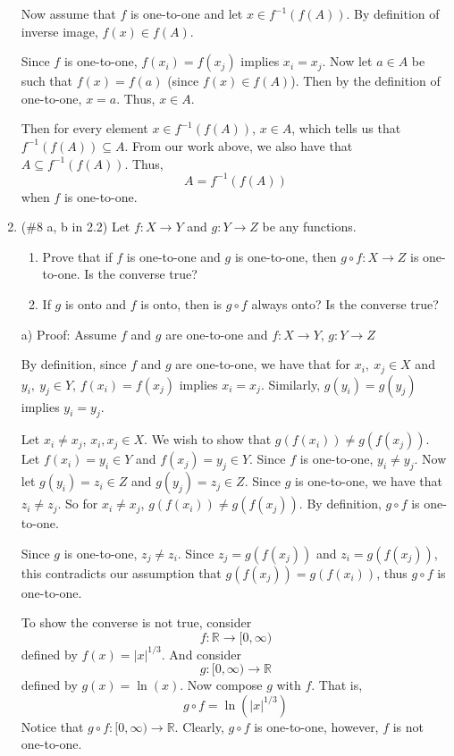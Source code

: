 \documentclass{article}
\begin{document}
\begin{enumerate}
Now assume that $f$ is one-to-one and let $x \in f^{-1}(f(A))$. By definition of inverse image, $f(x) \in f(A)$. 

Since $f$ is one-to-one, $f(x_i) = f(x_j)$ implies $x_i = x_j$. Now let $a \in A$ be such that $f(x) = f(a)$ (since $f(x) \in f(A)$). Then by the definition of one-to-one, $x = a$. Thus, $x \in A$.


Then for every element $x \in f^{-1}(f(A))$, $x \in A$, which tells us that $f^{-1}(f(A)) \subseteq A$. From our work above, we also have that $A \subseteq f^{-1}(f(A))$. Thus,
\[A = f^{-1}(f(A))\]
when $f$ is one-to-one.
\newline

\item{}
(\#8 a, b in 2.2) Let $f:X\to Y$ and $g:Y\to Z$ be any functions.
  \begin{enumerate}
  \item Prove that if $f$ is one-to-one and $g$ is one-to-one, then $g\circ f:X\to Z$ is one-to-one. Is the converse true?
  \item If $g$ is onto and $f$ is onto, then is $g\circ f$ always onto? Is the converse true?
  \end{enumerate}
  
  
a) Proof: Assume $f$ and $g$ are one-to-one and $f: X \to Y$, $g: Y \to Z$
\newline

By definition, since $f$ and $g$ are one-to-one, we have that for $x_i, \:x_j \in X$ and  $y_i, \: y_j \in Y$, $f(x_i) = f(x_j)$ implies $x_i = x_j$. Similarly, $g(y_i) = g(y_j)$ implies $y_i = y_j$.

Let $x_i \neq x_j$, $x_i, x_j \in X$. We wish to show that $g(f(x_i)) \neq g(f(x_j))$. Let $f(x_i) = y_i \in Y$ and $f(x_j) = y_j \in Y$. Since $f$ is one-to-one, $y_i \neq y_j$. Now let $g(y_i) = z_i \in Z$ and $g(y_j) = z_j \in Z$. Since $g$ is one-to-one, we have that $z_i \neq z_j$. So for $x_i \neq x_j$, $g(f(x_i)) \neq g(f(x_j))$. By definition, $g \circ f$ is one-to-one. 

Since $g$ is one-to-one, $z_j \neq z_i$. Since $z_j = g(f(x_j))$ and $z_i = g(f(x_j))$, this contradicts our assumption that $g(f(x_j)) = g(f(x_i))$, thus $g \circ f$ is one-to-one.
\newline\newline



To show the converse is not true, consider 
\[f : \mathbb{R} \to [0, \infty)\]
defined by $f(x) = |x|^{1/3}$. And consider
\[g : [0, \infty) \to \mathbb{R}\]
defined by $g(x) = \ln{(x)}$. Now compose $g$ with $f$. That is,
\[g \circ f = \ln{(|x|^{1/3})}\]
Notice that $g \circ f: [0, \infty) \to \mathbb{R}$.
Clearly, $g \circ f$ is one-to-one, however, $f$ is not one-to-one.
\newline


\end{enumerate}
\end{document}

